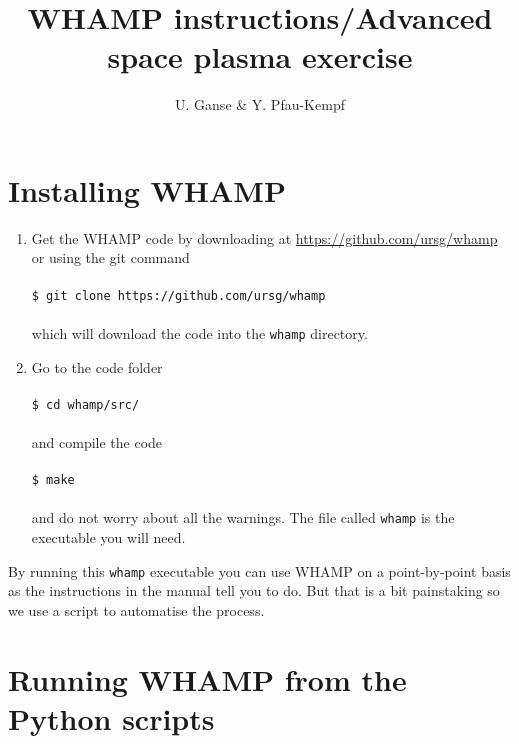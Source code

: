 \documentclass[a4paper,10pt]{article}
\title{WHAMP instructions/Advanced space plasma exercise}
\author{U. Ganse \& Y. Pfau-Kempf}
\begin{document}
\maketitle



\section{Installing WHAMP}

\begin{enumerate}
   \item Get the WHAMP code by downloading at \url{https://github.com/ursg/whamp}
   or using the git command \\ \\
   \verb=$ git clone https://github.com/ursg/whamp= \\ \\
   which will download the code into the \verb=whamp= directory.
   
   \item Go to the code folder \\ \\
   \verb=$ cd whamp/src/= \\ \\
   and compile the code \\ \\
   \verb=$ make= \\ \\
   and do not worry about all the warnings. The file called \verb=whamp= is the executable you will need.
\end{enumerate}

By running this \verb=whamp= executable you can use WHAMP on a point-by-point basis as the instructions in the manual tell you to do. But that is a bit painstaking so we use a script to automatise the process.


\section{Running WHAMP from the Python scripts}
\end{document}
